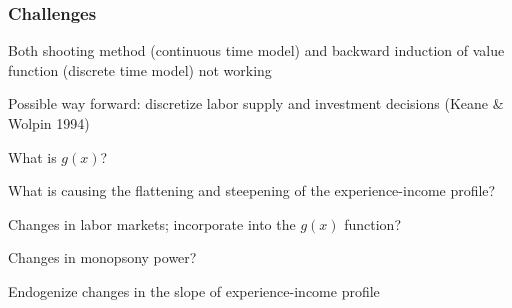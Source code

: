 \documentclass[aspectratio=169]{beamer}
\newenvironment{wideitemize}{\itemize\addtolength{\itemsep}{10pt}}{\enditemize}
\begin{document}
\begin{frame}
    \frametitle{Challenges}

    \begin{wideitemize}
        \item Both shooting method (continuous time model) and backward induction of value function (discrete time model) not working
        \item Possible way forward: discretize labor supply and investment decisions (Keane \& Wolpin 1994)
        \item What is $g(x)$?
        \item What is causing the flattening and steepening of the experience-income profile?
        \begin{wideitemize}
            \item Changes in labor markets; incorporate into the $g(x)$ function?
            \item Changes in monopsony power?
            \item Endogenize changes in the slope of experience-income profile
        \end{wideitemize}
    \end{wideitemize}

\end{frame}
\end{document}
